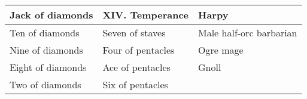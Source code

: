 \begin{longtable}{llllll}
{\begin{minipage}[t]{1.102in}
Jack of diamonds\end{minipage}} & \multicolumn{1}{p{1.207in}|}{\begin{minipage}[t]{1.207in}\raggedright
XIV. Temperance\end{minipage}} & \multicolumn{4}{p{2.191in}|}{\begin{minipage}[t]{2.191in}\raggedright
Harpy\end{minipage}}\\
\hline
\multicolumn{1}{|p{1.102in}|}{\begin{minipage}[t]{1.102in}\raggedright
Ten of diamonds\end{minipage}} & \multicolumn{1}{p{1.207in}|}{\begin{minipage}[t]{1.207in}\raggedright
Seven of staves\end{minipage}} & \multicolumn{4}{p{2.191in}|}{\begin{minipage}[t]{2.191in}\raggedright
Male half-orc barbarian\end{minipage}}\\
\hline
\multicolumn{1}{|p{1.102in}|}{\begin{minipage}[t]{1.102in}\raggedright
Nine of diamonds\end{minipage}} & \multicolumn{1}{p{1.207in}|}{\begin{minipage}[t]{1.207in}\raggedright
Four of pentacles\end{minipage}} & \multicolumn{4}{p{2.191in}|}{\begin{minipage}[t]{2.191in}\raggedright
Ogre mage\end{minipage}}\\
\hline
\multicolumn{1}{|p{1.102in}|}{\begin{minipage}[t]{1.102in}\raggedright
Eight of diamonds\end{minipage}} & \multicolumn{1}{p{1.207in}|}{\begin{minipage}[t]{1.207in}\raggedright
Ace of pentacles\end{minipage}} & \multicolumn{4}{p{2.191in}|}{\begin{minipage}[t]{2.191in}\raggedright
Gnoll\end{minipage}}\\
\hline
\multicolumn{1}{|p{1.102in}|}{\begin{minipage}[t]{1.102in}\raggedright
Two of diamonds\end{minipage}} & \multicolumn{1}{p{1.207in}|}{\begin{minipage}[t]{1.207in}\raggedright
Six of pentacles\end{minipage}} & \multicolumn{4}{p{2.191in}|}{\begin{minipage}[t]{2.191in}\raggedright

\end{minipage}}
\end{longtable}
